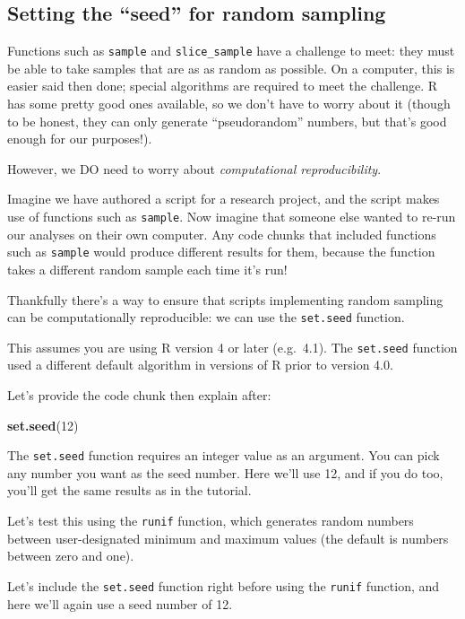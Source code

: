 \documentclass[
]{book}
\newenvironment{Shaded}{\begin{snugshade}}{\end{snugshade}}
\newcommand{\DecValTok}[1]{\textcolor[rgb]{0.00,0.00,0.81}{#1}}
\newcommand{\FunctionTok}[1]{\textcolor[rgb]{0.13,0.29,0.53}{\textbf{#1}}}
\newcommand{\NormalTok}[1]{#1}
\begin{document}
\subsection{Setting the ``seed'' for random sampling}\label{setseed}

Functions such as \texttt{sample} and \texttt{slice\_sample} have a challenge to meet: they must be able to take samples that are as as random as possible. On a computer, this is easier said then done; special algorithms are required to meet the challenge. R has some pretty good ones available, so we don't have to worry about it (though to be honest, they can only generate ``pseudorandom'' numbers, but that's good enough for our purposes!).

However, we DO need to worry about \emph{computational reproducibility}.

Imagine we have authored a script for a research project, and the script makes use of functions such as \texttt{sample}. Now imagine that someone else wanted to re-run our analyses on their own computer. Any code chunks that included functions such as \texttt{sample} would produce different results for them, because the function takes a different random sample each time it's run!

Thankfully there's a way to ensure that scripts implementing random sampling can be computationally reproducible: we can use the \texttt{set.seed} function.

This assumes you are using R version 4 or later (e.g.~4.1). The \texttt{set.seed} function used a different default algorithm in versions of R prior to version 4.0.

Let's provide the code chunk then explain after:

\begin{Shaded}
\begin{Highlighting}[]
\FunctionTok{set.seed}\NormalTok{(}\DecValTok{12}\NormalTok{)}
\end{Highlighting}
\end{Shaded}

The \texttt{set.seed} function requires an integer value as an argument. You can pick any number you want as the seed number. Here we'll use 12, and if you do too, you'll get the same results as in the tutorial.

Let's test this using the \texttt{runif} function, which generates random numbers between user-designated minimum and maximum values (the default is numbers between zero and one).

Let's include the \texttt{set.seed} function right before using the \texttt{runif} function, and here we'll again use a seed number of 12.
\end{document}
